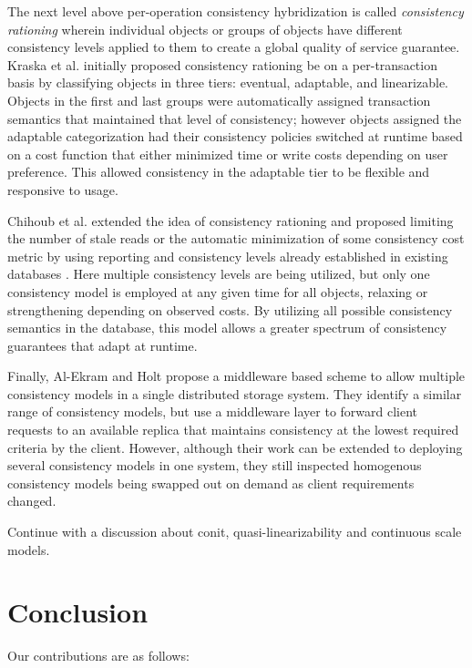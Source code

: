 \documentclass[letterpaper,twocolumn,10pt]{article}
\begin{document}
The next level above per-operation consistency hybridization is called \textit{consistency rationing} wherein individual objects or groups of objects have different consistency levels applied to them to create a global quality of service guarantee. Kraska et al. \cite{kraska_consistency_2009} initially proposed consistency rationing be on a per-transaction basis by classifying objects in three tiers: eventual, adaptable, and linearizable. Objects in the first and last groups were automatically assigned transaction semantics that maintained that level of consistency; however objects assigned the adaptable categorization had their consistency policies switched at runtime based on a cost function that either minimized time or write costs depending on user preference. This allowed consistency in the adaptable tier to be flexible and responsive to usage.

Chihoub et al. extended the idea of consistency rationing and proposed limiting the number of stale reads or the automatic minimization of some consistency cost metric by using reporting and consistency levels already established in existing databases \cite{chihoub_harmony:_2012,chihoub_consistency_2013}. Here multiple consistency levels are being utilized, but only one consistency model is employed at any given time for all objects, relaxing or strengthening depending on observed costs. By utilizing all possible consistency semantics in the database, this model allows a greater spectrum of consistency guarantees that adapt at runtime.

Finally, Al-Ekram and Holt \cite{al-ekram_multi-consistency_2010} propose a middleware based scheme to allow multiple consistency models in a single distributed storage system. They identify a similar range of consistency models, but use a middleware layer to forward client requests to an available replica that maintains consistency at the lowest required criteria by the client. However, although their work can be extended to deploying several consistency models in one system, they still inspected homogenous consistency models being swapped out on demand as client requirements changed.

Continue with a discussion about conit, quasi-linearizability and continuous scale models.

\section{Conclusion}

Our contributions are as follows:
\end{document}
